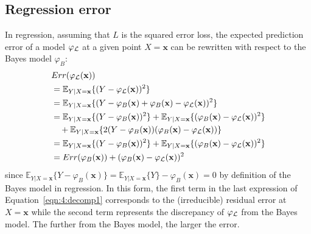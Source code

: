 \subsection{Regression error}

In regression, assuming that $L$ is the squared error loss, the expected
prediction error of a model $\varphi_{\cal L}$ at a given point $X=\mathbf{x}$
can be rewritten with respect to the Bayes model $\varphi_B$:
\begin{align}
& Err(\varphi_{\cal L}(\mathbf{x})) \nonumber \\
&= \mathbb{E}_{Y|X=\mathbf{x}} \{ (Y - \varphi_{\cal L}(\mathbf{x}))^2 \} \nonumber \\
&= \mathbb{E}_{Y|X=\mathbf{x}} \{ (Y -\varphi_B(\mathbf{x}) + \varphi_B(\mathbf{x}) - \varphi_{\cal L}(\mathbf{x}))^2 \} \nonumber \\
&= \mathbb{E}_{Y|X=\mathbf{x}} \{ (Y -\varphi_B(\mathbf{x}))^2  \} + \mathbb{E}_{Y|X=\mathbf{x}} \{ (\varphi_B(\mathbf{x}) - \varphi_{\cal L}(\mathbf{x}))^2 \} \nonumber \\
& \quad+ \mathbb{E}_{Y|X=\mathbf{x}} \{ 2 (Y - \varphi_B(\mathbf{x}))(\varphi_B(\mathbf{x}) - \varphi_{\cal L}(\mathbf{x})) \} \nonumber \\
&= \mathbb{E}_{Y|X=\mathbf{x}} \{ (Y -\varphi_B(\mathbf{x}))^2 \} + \mathbb{E}_{Y|X=\mathbf{x}} \{ (\varphi_B(\mathbf{x}) - \varphi_{\cal L}(\mathbf{x}))^2 \} \nonumber \\
&= Err(\varphi_B(\mathbf{x})) +  (\varphi_B(\mathbf{x}) - \varphi_{\cal L}(\mathbf{x}))^2 \label{eqn:4:decomp1}
\end{align}
since $\mathbb{E}_{Y|X=\mathbf{x}} \{ Y - \varphi_B(\mathbf{x}) \} =
\mathbb{E}_{Y|X=\mathbf{x}} \{ Y \} - \varphi_B(\mathbf{x}) = 0$ by definition
of the Bayes model in regression. In this form, the first term in
the last expression of Equation~\ref{eqn:4:decomp1} corresponds to the (irreducible) residual error
 at $X=\mathbf{x}$ while the
second term represents the discrepancy of $\varphi_{\cal L}$ from the
Bayes model. The further from the Bayes model, the larger the error.

